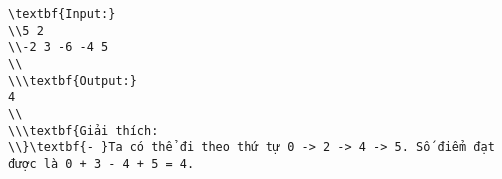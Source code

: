 \begin{verbatim}
\textbf{Input:}
\\5 2
\\-2 3 -6 -4 5
\\
\\\textbf{Output:}
4
\\
\\\textbf{Giải thích:
\\}\textbf{- }Ta có thể đi theo thứ tự 0 -> 2 -> 4 -> 5. Số điểm đạt được là 0 + 3 - 4 + 5 = 4.\end{verbatim}